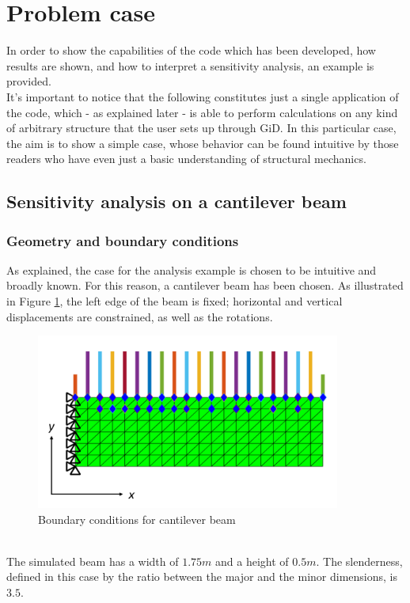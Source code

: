
\section{Problem case}

In order to show the capabilities of the code which has been developed, how results are shown, and how to interpret a sensitivity analysis, an example is provided.\\[6pt]
It's important to notice that the following constitutes just a single application of the code, which - as explained later - is able to perform calculations on any kind of arbitrary structure that the user sets up through GiD. In this particular case, the aim is to show a simple case, whose behavior can be found intuitive by those readers who have even just a basic understanding of structural mechanics.

\subsection{Sensitivity analysis on a cantilever beam}
\subsubsection{Geometry and boundary conditions}
As explained, the case for the analysis example is chosen to be intuitive and broadly known. For this reason, a cantilever beam has been chosen. As illustrated in Figure \ref{cantileverBeam:BCs}, the left edge of the beam is fixed; horizontal and vertical displacements are constrained, as well as the rotations.\\
\begin{figure}[ht]
\centering
  \includegraphics[width=100mm]{images/cantileverBeamBCs.png}
  \caption{Boundary conditions for cantilever beam}
  \label{cantileverBeam:BCs}
\end{figure} \\
The simulated beam has a width of $1.75m$ and a height of $0.5m$.
The slenderness, defined in this case by the ratio between the major and the minor dimensions, is  $3.5$. 
